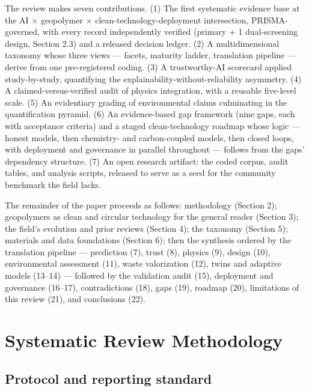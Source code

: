 \documentclass[pdflatex,sn-basic]{sn-jnl}
\begin{document}
The review makes seven contributions. (1) The first systematic evidence base at the AI $\times$ geopolymer $\times$ clean-technology-deployment intersection, PRISMA-governed, with every record independently verified (primary + 1 dual-screening design, Section 2.3) and a released decision ledger. (2) A multidimensional taxonomy whose three views --- facets, maturity ladder, translation pipeline --- derive from one pre-registered coding. (3) A trustworthy-AI scorecard applied study-by-study, quantifying the explainability-without-reliability asymmetry. (4) A claimed-versus-verified audit of physics integration, with a reusable five-level scale. (5) An evidentiary grading of environmental claims culminating in the quantification pyramid. (6) An evidence-based gap framework (nine gaps, each with acceptance criteria) and a staged clean-technology roadmap whose logic --- honest models, then chemistry- and carbon-coupled models, then closed loops, with deployment and governance in parallel throughout --- follows from the gaps' dependency structure. (7) An open research artifact: the coded corpus, audit tables, and analysis scripts, released to serve as a seed for the community benchmark the field lacks.

The remainder of the paper proceeds as follows: methodology (Section 2); geopolymers as clean and circular technology for the general reader (Section 3); the field's evolution and prior reviews (Section 4); the taxonomy (Section 5); materials and data foundations (Section 6); then the synthesis ordered by the translation pipeline --- prediction (7), trust (8), physics (9), design (10), environmental assessment (11), waste valorization (12), twins and adaptive models (13--14) --- followed by the validation audit (15), deployment and governance (16--17), contradictions (18), gaps (19), roadmap (20), limitations of this review (21), and conclusions (22).

\section{Systematic Review Methodology}

\subsection{Protocol and reporting standard}
\end{document}
